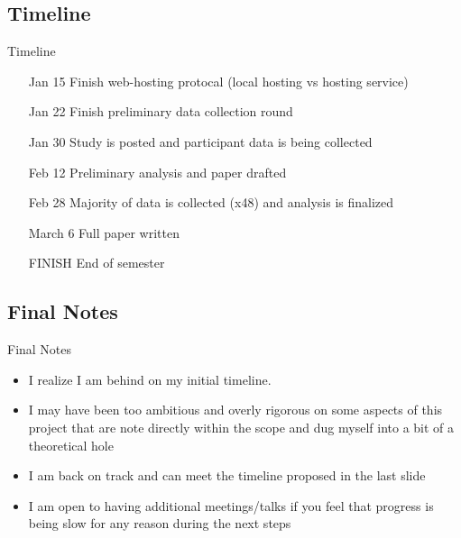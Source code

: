 \documentclass[aspectratio=1610, xcolor=dvipsnames]{packages/beamer}
\begin{document}
\subsection{Timeline}
\begin{frame}{Timeline}
    \begin{itemize}
        \begin{itemize}
            \item[Jan 15] Finish web-hosting protocal (local hosting vs hosting service)
            \item[Jan 22] Finish preliminary data collection round
            \item[Jan 30] Study is posted and participant data is being collected
            \item[Feb 12] Preliminary analysis and paper drafted
            \item[Feb 28] Majority of data is collected (x48) and analysis is finalized
            \item[March 6] Full paper written
            \item[FINISH] End of semester
        \end{itemize}
    \end{itemize}
\end{frame}

\subsection{Final Notes}
\begin{frame}{Final Notes}
    \begin{itemize}
        \item I realize I am behind on my initial timeline.
        \item I may have been too ambitious and overly rigorous on some aspects of this project that
        are note directly within the scope and dug myself into a bit of a theoretical hole
        \item I am back on track and can meet the timeline proposed in the last slide
        \item I am open to having additional meetings/talks if you feel that progress is being slow for any reason
        during the next steps
    \end{itemize}
\end{frame}
\end{document}
